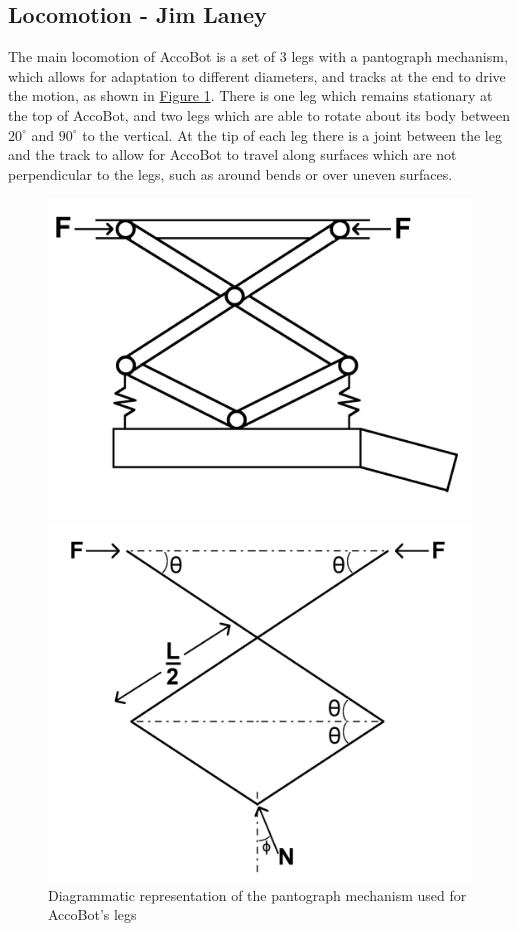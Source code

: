 \documentclass[11pt]{article}		%
\newlength{\imageheight}	 %
\newcommand{\figref}[1]{\hyperref[#1]{Figure \ref*{#1}}}    %
\begin{document}
		\subsection[Locomotion]{Locomotion - Jim Laney}
			The main locomotion of AccoBot is a set of 3 legs with a pantograph mechanism, which allows for adaptation to different diameters, and tracks at the end to drive the motion, as shown in \figref{legDesign}.
			There is one leg which remains stationary at the top of AccoBot, and two legs which are able to rotate about its body between $20^\circ$ and $90^\circ$ to the vertical.
			At the tip of each leg there is a joint between the leg and the track to allow for AccoBot to travel along surfaces which are not perpendicular to the legs, such as around bends or over uneven surfaces.
			\begin{figure}[h]
				\centering
				\begin{multicols}{2}
					\includegraphics[height=\imageheight]{legDesign}
					\caption{Diagrammatic representation of the pantograph mechanism used for AccoBot's legs}
					\label{legDesign}
					\columnbreak
					\includegraphics[height=\imageheight]{legDiagram}

\end{multicols}
\end{figure}
\end{document}
